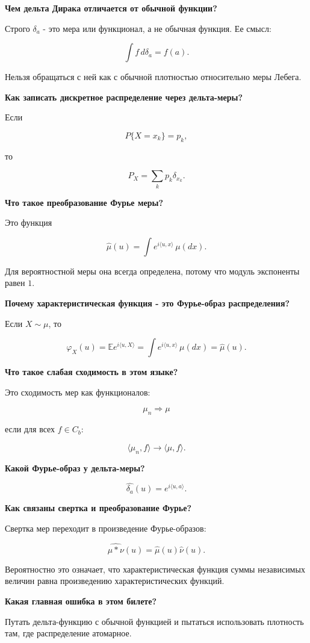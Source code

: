 \documentclass[
  11pt,
  a4paper,
]{article}
\begin{document}
\textbf{Чем дельта Дирака отличается от обычной функции?}

Строго \(\delta_a\) - это мера или функционал, а не обычная функция. Ее
смысл:

\[
\int f\,d\delta_a=f(a).
\]

Нельзя обращаться с ней как с обычной плотностью относительно меры
Лебега.

\textbf{Как записать дискретное распределение через дельта-меры?}

Если

\[
P\{X=x_k\}=p_k,
\]

то

\[
P_X=\sum_kp_k\delta_{x_k}.
\]

\textbf{Что такое преобразование Фурье меры?}

Это функция

\[
\widehat\mu(u)=\int e^{i\langle u,x\rangle}\,\mu(dx).
\]

Для вероятностной меры она всегда определена, потому что модуль
экспоненты равен \(1\).

\textbf{Почему характеристическая функция - это Фурье-образ
распределения?}

Если \(X\sim\mu\), то

\[
\varphi_X(u)
=
\mathbb E e^{i\langle u,X\rangle}
=
\int e^{i\langle u,x\rangle}\,\mu(dx)
=
\widehat\mu(u).
\]

\textbf{Что такое слабая сходимость в этом языке?}

Это сходимость мер как функционалов:

\[
\mu_n\Rightarrow\mu
\]

если для всех \(f\in C_b\):

\[
\langle\mu_n,f\rangle\to\langle\mu,f\rangle.
\]

\textbf{Какой Фурье-образ у дельта-меры?}

\[
\widehat{\delta_a}(u)=e^{i\langle u,a\rangle}.
\]

\textbf{Как связаны свертка и преобразование Фурье?}

Свертка мер переходит в произведение Фурье-образов:

\[
\widehat{\mu*\nu}(u)=\widehat\mu(u)\widehat\nu(u).
\]

Вероятностно это означает, что характеристическая функция суммы
независимых величин равна произведению характеристических функций.

\textbf{Какая главная ошибка в этом билете?}

Путать дельта-функцию с обычной функцией и пытаться использовать
плотность там, где распределение атомарное.
\end{document}
